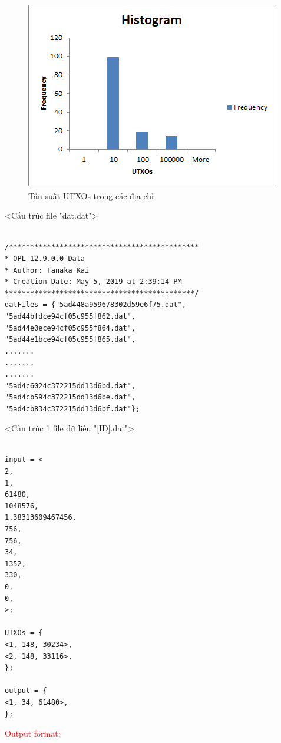 \documentclass[a4paper]{article}
\begin{document}
\newpage
\begin{center}
	\begin{figure} []
		\begin{center}
			\includegraphics[scale=1]{tansuatUTXOs}
		\end{center}
		\caption{Tần suất UTXOs trong các địa chỉ}
		\label{refhinh0}
	\end{figure}
\end{center}

<Cấu trúc file "dat.dat">
\begin{lstlisting}[frame=single]

/*********************************************
* OPL 12.9.0.0 Data
* Author: Tanaka Kai
* Creation Date: May 5, 2019 at 2:39:14 PM
*********************************************/
datFiles = {"5ad448a959678302d59e6f75.dat",
"5ad44bfdce94cf05c955f862.dat",
"5ad44e0ece94cf05c955f864.dat",
"5ad44e1bce94cf05c955f865.dat",
.......
.......
.......			
"5ad4c6024c372215dd13d6bd.dat",
"5ad4cb594c372215dd13d6be.dat",
"5ad4cb834c372215dd13d6bf.dat"};

\end{lstlisting}


<Cấu trúc 1 file dữ liêu "[ID].dat">
\begin{lstlisting}[frame=single]

input = <
2, 
1, 
61480, 
1048576, 
1.38313609467456, 
756, 
756, 
34, 
1352, 
330, 
0, 
0, 
>;

UTXOs = { 
<1, 148, 30234>, 
<2, 148, 33116>, 
};

output = { 
<1, 34, 61480>, 
};

\end{lstlisting}

\textcolor{red}{Output format:}
\end{document}
